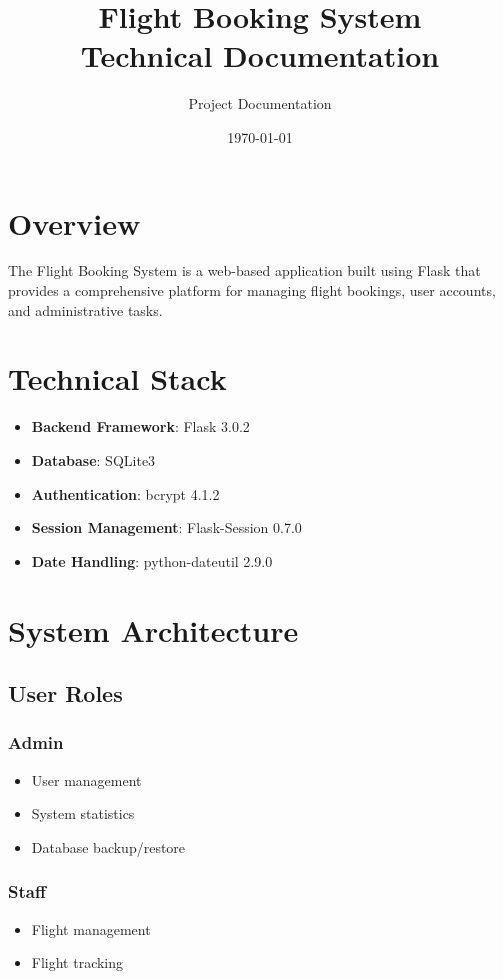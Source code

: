 \documentclass{article}
\title{Flight Booking System\\Technical Documentation}
\author{Project Documentation}
\date{\today}
\begin{document}
\maketitle
\tableofcontents

\section{Overview}
The Flight Booking System is a web-based application built using Flask that provides a comprehensive platform for managing flight bookings, user accounts, and administrative tasks.

\section{Technical Stack}
\begin{itemize}
    \item \textbf{Backend Framework}: Flask 3.0.2
    \item \textbf{Database}: SQLite3
    \item \textbf{Authentication}: bcrypt 4.1.2
    \item \textbf{Session Management}: Flask-Session 0.7.0
    \item \textbf{Date Handling}: python-dateutil 2.9.0
\end{itemize}

\section{System Architecture}

\subsection{User Roles}
\subsubsection{Admin}
\begin{itemize}
    \item User management
    \item System statistics
    \item Database backup/restore
\end{itemize}

\subsubsection{Staff}
\begin{itemize}
    \item Flight management
    \item Flight tracking
\end{itemize}
\end{document}
